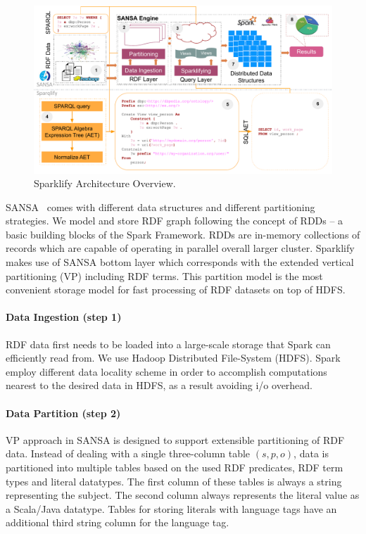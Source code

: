 \begin{figure}
\centering
\includegraphics[width=1.0\textwidth]{images/6_scalable_rdf_querying/sparklify-architecture.pdf}
\caption{Sparklify Architecture Overview.}
\label{fig:sparklify-architecture}
\end{figure}


SANSA~\cite{lehmann-2017-sansa-iswc} comes with different data structures and different partitioning strategies.
We model and store RDF graph following the concept of RDDs -- a basic building blocks of the Spark Framework.
RDDs are in-memory collections of records which are capable of operating in parallel overall larger cluster.
Sparklify makes use of SANSA bottom layer which corresponds with the extended vertical partitioning (VP) including RDF terms.
This partition model is the most convenient storage model for fast processing of RDF datasets on top of HDFS.
\paragraph{Data Ingestion (step 1)} RDF data first needs to be loaded into a large-scale storage that Spark can efficiently read from.
We use Hadoop Distributed File-System (HDFS).
Spark employ different data locality scheme in order to accomplish computations nearest to the desired data in HDFS, as a result avoiding i/o overhead. 
\paragraph{Data Partition (step 2)}
VP approach in SANSA is designed to support extensible partitioning of RDF data.
Instead of dealing with a single three-column table $(s, p, o)$, data is partitioned into multiple tables based on the used RDF predicates, RDF term types and literal datatypes.
The first column of these tables is always a string representing the subject.
The second column always represents the literal value as a Scala/Java datatype.
Tables for storing literals with language tags have an additional third string column for the language tag.

